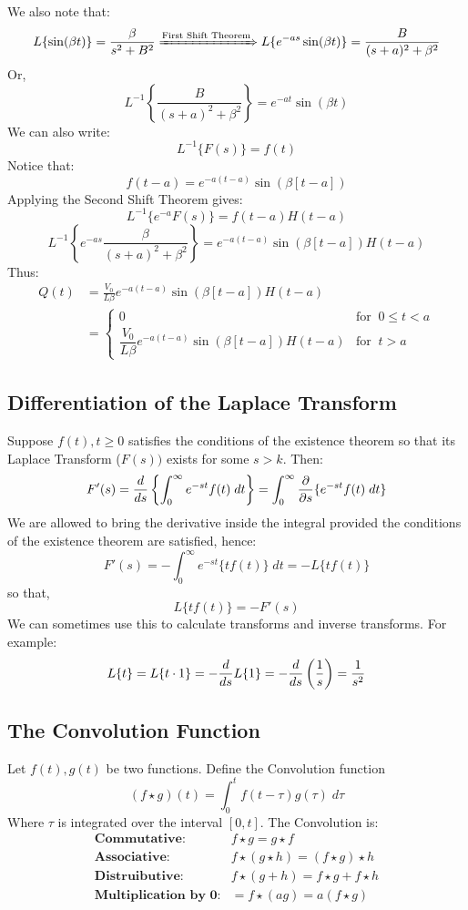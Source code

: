\documentclass[a4paper, 10pt]{article}
\begin{document}
\begin{examplebox}
  We also note that:
  $$L\{\sin(\beta t)\} = \frac{\beta}{s^2 + B^2} \xRightarrow{\text{First Shift Theorem}} L\{e^{-as} \sin(\beta t)\} = \frac{B}{(s+a)^2 + \beta^2}$$
  Or,
  $$L^{-1} \left\{\frac{B}{(s+a)^2 + \beta^2}\right\} = e^{-at}\sin(\beta t)$$
  We can also write:
  $$L^{-1}\{F(s)\} = f(t)$$
  Notice that:
  $$f(t-a) = e^{-a(t-a)} \sin(\beta [t-a])$$
  Applying the Second Shift Theorem gives:
  $$L^{-1}\{e^{-a} F(s)\} = f(t-a)H(t-a)$$
  $$L^{-1} \left\{e^{-as}\frac{\beta}{(s+a)^2 + \beta^2}\right\} = e^{-a(t-a)}\sin(\beta[t-a])H(t-a)$$
  Thus:
  \begin{align*}
    Q(t) & = \frac{V_0}{L\beta} e^{-a(t-a)}\sin(\beta[t-a])H(t-a)                                \\
         & = \begin{cases}
               0                                                     & \text{for}\;\; 0 \leq t < a \\
               \dfrac{V_0}{L\beta} e^{-a(t-a)}\sin(\beta[t-a])H(t-a) & \text{for}\;\; t > a
             \end{cases}
  \end{align*}
  \normalsize
\end{examplebox}
\pagebreak
\subsection{Differentiation of the Laplace Transform}
Suppose $f(t), t \geq 0$ satisfies the conditions of the existence theorem so
that its Laplace Transform ($F(s))$ exists for some $s > k$. Then:
$$F'(s) = \frac{d}{ds} \left\{ \int_0^\infty e^{-st}f(t)\; dt \right\} = \int_0^\infty \frac{\partial}{\partial s}\{e^{-st}f(t) \; dt\}$$
We are allowed to bring the derivative inside the integral provided the conditions of the existence theorem are satisfied, hence:
$$F'(s) = -\int_0^\infty e^{-st}\{tf(t)\}\; dt = -L\{tf(t)\}$$
so that,
$$L\{tf(t)\} = -F'(s)$$
We can sometimes use this to calculate transforms and inverse transforms. For example:
$$L\{t\} = L\{t \cdot 1\} = - \frac{d}{ds}L\{1\} = -\frac{d}{ds}\left(\frac{1}{s}\right) = \frac{1}{s^2}$$

\subsection{The Convolution Function}
Let $f(t), g(t)$ be two functions. Define the Convolution function
$$(f \star g)(t) = \int_0^t f(t-\tau)g(\tau) \; d\tau$$
Where $\tau$ is integrated over the interval $[0,t]$.  The Convolution is:
\begin{align*}
  \textbf{Commutative:}         & f \star g = g \star f                     \\
  \textbf{Associative:}         & f \star (g \star h) = (f \star g) \star h \\
  \textbf{Distruibutive:}       & f \star (g + h) = f \star g + f \star h   \\
  \textbf{Multiplication by 0:} & = f \star (ag) = a(f \star g)
\end{align*}
\end{document}
